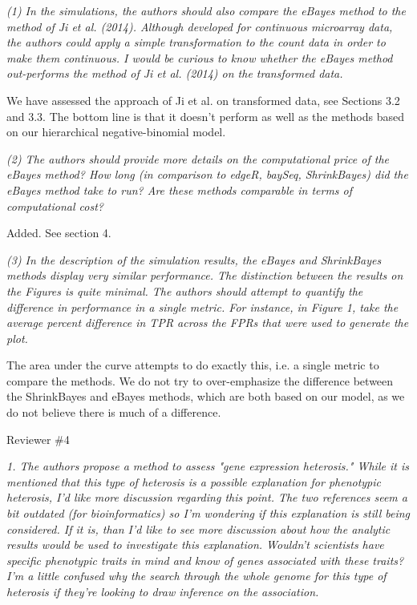 \documentclass{article}
\newcommand{\comment}[1]{\textit{#1}}
\newcommand{\response}[1]{#1}
\begin{document}
\comment{(1) In the simulations, the authors should also compare the eBayes method to the method of Ji et al. (2014). Although developed for continuous microarray data, the authors could apply a simple transformation to the count data in order to make them continuous. I would be curious to know whether the eBayes method out-performs the method of Ji et al. (2014) on the transformed data.}

\response{We have assessed the approach of Ji et al. on transformed data, see Sections 3.2 and 3.3. The bottom line is that it doesn't perform as well as the methods based on our hierarchical negative-binomial model.}

\comment{(2) The authors should provide more details on the computational price of the eBayes method? How long (in comparison to edgeR, baySeq, ShrinkBayes) did the eBayes method take to run? Are these methods comparable in terms of computational cost?}

\response{Added. See section 4.}

\comment{(3) In the description of the simulation results, the eBayes and ShrinkBayes methods display very similar performance. The distinction between the results on the Figures is quite minimal. The authors should attempt to quantify the difference in performance in a single metric. For instance, in Figure 1, take the average percent difference in TPR across the FPRs that were used to generate the plot.}

\response{The area under the curve attempts to do exactly this, i.e. a single metric to compare the methods. We do not try to over-emphasize the difference between the ShrinkBayes and eBayes methods, which are both based on our model, as we do not believe there is much of a difference.}



Reviewer \#4

\comment{1. The authors propose a method to assess "gene expression heterosis."   While it is mentioned that this type of heterosis is a possible explanation for phenotypic heterosis, I'd like more discussion regarding this point.  The two references seem a bit outdated (for bioinformatics) so I'm wondering if this explanation is still being considered.  If it is, than I'd like to see more discussion about how the analytic results would be used to investigate this explanation.   Wouldn't scientists have specific phenotypic traits in mind and know of genes associated with these traits?  I'm a little confused why the search through the whole genome for this type of heterosis if they're looking to draw inference on the association.}
\end{document}
